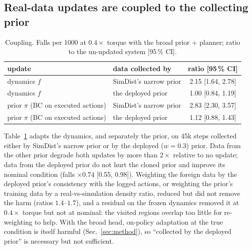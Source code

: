 \documentclass[conference]{IEEEtran}
\begin{document}
\subsection{Real-data updates are coupled to the collecting prior}
\begin{table}[t]\centering\caption{Coupling. Falls per 1000 at $0.4\times$ torque with the broad prior + planner; ratio to the un-updated system [95\,\% CI].}\label{tab:coupling}
\scriptsize\begin{tabular}{@{}llc@{}}\toprule
update & data collected by & ratio [95\,\% CI]\\\midrule
dynamics $f$ & SimDist's narrow prior & 2.15 [1.64, 2.78]\\
dynamics $f$ & the deployed prior & 1.00 [0.84, 1.19]\\
prior $\pi$ (BC on executed actions) & SimDist's narrow prior & 2.83 [2.30, 3.57]\\
prior $\pi$ (BC on executed actions) & the deployed prior & 1.12 [0.88, 1.43]\\\bottomrule
\end{tabular}\end{table}
Table~\ref{tab:coupling} adapts the dynamics, and separately the prior, on 45k steps collected either by SimDist's narrow prior or by the deployed ($w=0.3$) prior. Data from the other prior degrade both updates by more than $2\times$ relative to no update; data from the deployed prior do not hurt the cloned prior and improve its nominal condition (falls $\times0.74$ [0.55, 0.98]). Weighting the foreign data by the deployed prior's consistency with the logged actions, or weighting the prior's training data by a real-vs-simulation density ratio, reduced but did not remove the harm (ratios $1.4$--$1.7$), and a residual on the frozen dynamics removed it at $0.4\times$ torque but not at nominal: the visited regions overlap too little for re-weighting to help. With the broad head, on-policy adaptation at the true condition is itself harmful (Sec.~\ref{sec:method}), so ``collected by the deployed prior'' is necessary but not sufficient.
\end{document}

